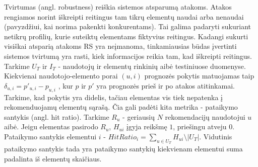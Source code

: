 \documentclass{VUMIFInfMagistrinis}
\begin{document}
Tvirtumas (angl. robustness) reiškia sistemos atsparumą atakoms. Atakos rengiamos norint iškreipti reitingus tam tikrų elementų naudai arba nenaudai (pavyzdžiui, kai norima pakenkti konkurentams). Tai galima padaryti sukuriant netikrų profilių, kurie suteiktų elementams fiktyvius reitingus. Kadangi sukurti visiškai atsparią atakoms RS yra neįmanoma, tinkamiausias būdas įvertinti sistemos tvirtumą yra rasti, kiek informacijos reikia tam, kad iškreipti reitingus. 
\newline
\indent
Tarkime $U_T$ ir $I_T$ - naudotojų ir elementų rinkinių aibė testiniuose duomenyse. Kiekvienai naudotojo-elemento porai $(u,i)$ prognozės pokytis matuojamas taip $\delta_{u,i} = p\prime_{u,i} - p_{u,i}$ , kur $p$ ir $p\prime$ yra prognozės prieš ir po atakos atitinkamai. Tarkime, kad pokytis yra didelis, tačiau elementas vis tiek nepatenka į rekomenduojamų elementų sąrašą. Čia gali padėti kita metrika - pataikymo santykis (angl. hit ratio). Tarkime $R_u$ - geriausių $N$ rekomendacijų naudotojui $u$ aibė. Jeigu elementas pasirodo  $R_u$, $H_{ui}$ įgyja reikšmę $1$, priešingu atveju $0$. Pataikymo santykis elementui $i$ - $HitRatio_i = \sum \limits_{u \in U_T} H_{ui} \setminus |U_T|$. Vidutinis pataikymo santykis tada yra pataikymo santykių kiekvienam elementui suma padalinta iš elementų skaičiaus.
\end{document}
